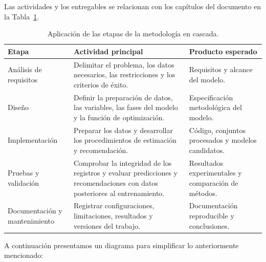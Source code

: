 Las actividades y los entregables se relacionan con los capítulos del documento en la Tabla~\ref{tab:metodologia_cascada_tt}.

\begin{table}[htbp]
\centering
\small
\renewcommand{\arraystretch}{1.18}
\caption{Aplicación de las etapas de la metodología en cascada.}
\label{tab:metodologia_cascada_tt}
\begin{tabularx}{\textwidth}{@{}p{3.2cm}Xp{3.2cm}@{}}
\toprule
\textbf{Etapa} & \textbf{Actividad principal} & \textbf{Producto esperado}\\
\midrule
Análisis de requisitos & Delimitar el problema, los datos necesarios, las restricciones y los criterios de éxito. & Requisitos y alcance del modelo.\\
Diseño & Definir la preparación de datos, las variables, las fases del modelo y la función de optimización. & Especificación metodológica del modelo.\\
Implementación & Preparar los datos y desarrollar los procedimientos de estimación y recomendación. & Código, conjuntos procesados y modelos candidatos.\\
Pruebas y validación & Comprobar la integridad de los registros y evaluar predicciones y recomendaciones con datos posteriores al entrenamiento. & Resultados experimentales y comparación de métodos.\\
Documentación y mantenimiento & Registrar configuraciones, limitaciones, resultados y versiones del trabajo. & Documentación reproducible y conclusiones.\\
\bottomrule
\end{tabularx}
\end{table}
A continuación presentamos un diagrama para simplificar lo anteriormente mencionado:


